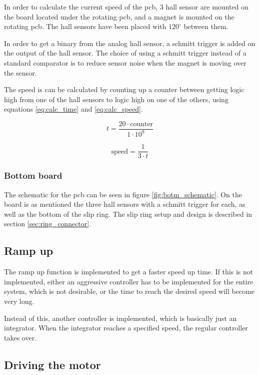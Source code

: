 In order to calculate the current speed of the pcb, 3 hall sensor are mounted on the board located under the rotating pcb, and a magnet is mounted on the rotating pcb.
The hall sensors have been placed with $120^{\circ}$ between them.

In order to get a binary from the analog hall sensor, a schmitt trigger is added on the output of the hall sensor.
The choice of using a schmitt trigger instead of a standard comparator is to reduce sensor noise when the magnet is moving over the sensor.

The speed is can be calculated by counting up a counter between getting logic high from one of the hall sensors to  logic high on one of the others, using equations  \ref{eq:calc_time} and \ref{eq:calc_speed}.

\begin{equation} \label{eq:calc_time}
 t = \frac{20\cdot \text{counter}}{1\cdot 10^9}
\end{equation}

\begin{equation} \label{eq:calc_speed}
 \text{speed} = \frac{1}{3\cdot t}
\end{equation}

\subsubsection{Bottom board}
The schematic for the pcb can be seen in figure \ref{fig:botm_schematic}.
On the board is as mentioned the three hall sensors with a schmitt trigger for each, as well as the bottom of the slip ring. The slip ring setup and design is described in section \ref{sec:ring_connector}. 


\subsection{Ramp up}

The ramp up function is implemented to get a faster speed up time.
If this is not implemented, either an aggressive controller has to be implemented for the entire system, which is not desirable, or the time to reach the desired speed will become very long.

Instead of this, another controller is implemented, which is basically just an integrator.
When the integrator reaches a specified speed, the regular controller takes over. 


\subsection{Driving the motor}

